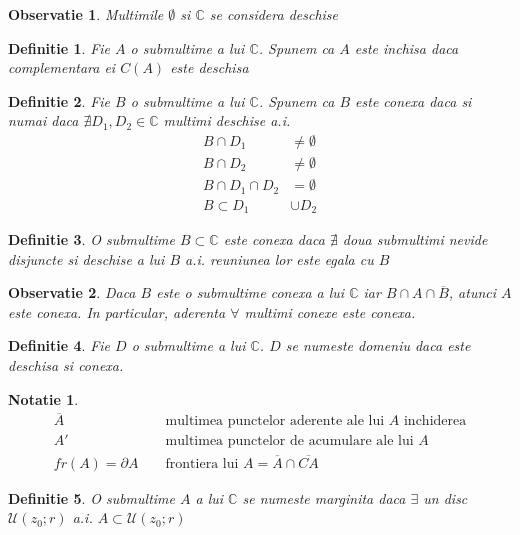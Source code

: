 \documentclass[10pt,a4paper]{article}
\newtheorem{definition}{Definitie}
\newtheorem{notation}{Notatie}
\newtheorem{observation}{Observatie}
\newcommand{\C}{\ensuremath{\mathbb{C}}}
\begin{document}
\begin{observation}
	Multimile $\emptyset$ si $\C$ se considera deschise
\end{observation}

\begin{definition}
	Fie $A$ o submultime a lui $\C$.
	Spunem ca $A$ este inchisa daca complementara ei $C(A)$ este deschisa
\end{definition}

\begin{definition}
	Fie $B$ o submultime a lui $\C$. Spunem ca $B$ este conexa daca si numai
	daca $\nexists D_1, D_2 \in \C$ multimi deschise a.i.
	\begin{align*}
		B \cap D_1 &\neq \emptyset \\
		B \cap D_2 &\neq \emptyset \\
		B \cap D_1 \cap D_2 &= \emptyset \\
		B \subset D_1 &\cup D_2
	\end{align*}
\end{definition}

\begin{definition}
	O submultime $B \subset \C$ este conexa daca $\nexists$ doua submultimi
	nevide disjuncte si deschise a lui $B$ a.i. reuniunea lor este egala cu $B$
\end{definition}

\begin{observation}
	Daca $B$ este o submultime conexa a lui $\C$ iar $B \cap A \cap	\overline{B}$,
	atunci $A$ este conexa. In particular, aderenta $\forall$ multimi conexe este conexa.
\end{observation}

\begin{definition}
	Fie $D$ o submultime a lui $\C$. $D$ se numeste domeniu daca este deschisa si conexa.
\end{definition}

\begin{notation}
	\begin{align*}
		\overline{A} && \text{ multimea punctelor aderente ale lui } A \text{ inchiderea} \\
		A' && \text { multimea punctelor de acumulare ale lui } A \\
		fr(A) = \partial A && \text { frontiera lui } A = \overline{A} \cap \overline{CA}
	\end{align*}
\end{notation}

\begin{definition}
 	O  submultime $A$ a lui $\C$ se numeste marginita daca $\exists$ un disc
 	$\mathcal{U}(z_0;r)$ a.i. $A \subset \mathcal{U}(z_0;r)$
\end{definition}
\end{document}
